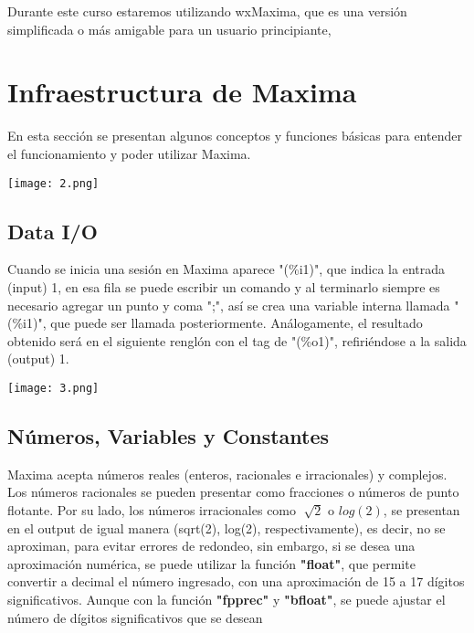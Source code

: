 \documentclass[12pt]{article}
\begin{document}
Durante este curso estaremos utilizando wxMaxima, que es una versión simplificada o más amigable para un usuario principiante, 

\section{Infraestructura de Maxima}

En esta sección se presentan algunos conceptos y funciones básicas para entender el funcionamiento y poder utilizar Maxima.

\begin{center}
 \texttt{[image: 2.png]}
 \end{center}

\subsection{Data I/O}

Cuando se inicia una sesión en Maxima aparece "(\%i1)", que indica la entrada (input) 1, en esa fila se puede escribir un comando y al terminarlo siempre es necesario agregar un punto y coma ";", así se crea una variable interna llamada "(\%i1)", que puede ser llamada posteriormente. Análogamente, el resultado obtenido será en el siguiente renglón con el tag de "(\%o1)", refiriéndose a la salida (output) 1.

\begin{center}
 \texttt{[image: 3.png]}
 \end{center}

\subsection{Números, Variables y Constantes}

Maxima acepta números reales (enteros, racionales e irracionales) y complejos. Los números racionales se pueden presentar como fracciones o números de punto flotante. Por su lado, los números irracionales como $\sqrt[]{2}$ o $log(2)$, se presentan en el output de igual manera (sqrt(2), log(2), respectivamente), es decir, no se aproximan, para evitar errores de redondeo, sin embargo, si se desea una aproximación numérica, se puede utilizar la función \textbf{"float"}, que permite convertir a decimal el número ingresado, con una aproximación de 15 a 17 dígitos significativos. Aunque con la función \textbf{"fpprec"} y \textbf{"bfloat"}, se puede ajustar el número de dígitos significativos que se desean\\
\end{document}
